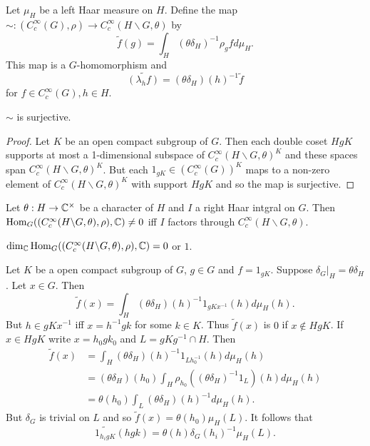 \documentclass{memoir}
\begin{document}
\begin{definition}
    Let $\mu_H$ be a left Haar measure on $H$.
    Define the map $\sim:(C_c^\infty(G),\rho)\to C_c^\infty(H\backslash G,\theta)$ by
    \begin{equation}
        \tilde f(g) = \int_H (\theta\delta_H)^{-1}\rho_gfd\mu_H.
    \end{equation}
    This map is a $G$-homomorphism and 
    \begin{equation}
        \widetilde{(\lambda_hf)} = (\theta\delta_H)(h)^{-1}\tilde f
    \end{equation}
    for $f\in C_c^\infty(G),h\in H$.
\end{definition}
\begin{lemma}
    $\sim$ is surjective.
\end{lemma}
\begin{proof}
    Let $K$ be an open compact subgroup of $G$.
    Then each double coset $HgK$ supports at most a 1-dimensional subspace of $C_c^\infty(H\backslash G,\theta)^K$ and these spaces span $C_c^\infty(H\backslash G,\theta)^K$.
    But each $1_{gK}\in (C_c^\infty(G))^K$ maps to a non-zero element of $C_c^\infty(H\backslash G,\theta)^K$ with support $HgK$ and so the map is surjective.
\end{proof}
\begin{corollary}
    Let $\theta:H\to \mathbb{C}^\times$ be a character of $H$ and $I$ a right Haar intgral on $G$.
    Then $\operatorname{Hom}_G((C_c^\infty(H\backslash G,\theta),\rho),\mathbb{C}) \ne 0$ iff $I$ factors through $C_c^\infty(H\backslash G,\theta)$.
\end{corollary}
\begin{corollary}
    $\dim_{\mathbb{C}}\operatorname{Hom}_G((C_c^\infty(H\backslash G,\theta),\rho),\mathbb{C}) = 0$ or $1$.
\end{corollary}
\begin{remark}
    Let $K$ be a open compact subgroup of $G$, $g\in G$ and $f = 1_{gK}$.
    Suppose $\delta_G|_H = \theta \delta_H$.
    Let $x\in G$. 
    Then 
    \begin{equation}
        \tilde f(x) = \int_H (\theta\delta_H)(h)^{-1}1_{gKx^{-1}}(h) d\mu_H(h).
    \end{equation}
    But $h\in gKx^{-1}$ iff $x = h^{-1}gk$ for some $k\in K$.
    Thus $\tilde f(x)$ is $0$ if $x\not\in HgK$.
    If $x\in HgK$ write $x = h_0gk_0$ and $L = gKg^{-1}\cap H$.
    Then 
    \begin{align}
        \tilde f(x) &= \int_H (\theta\delta_H)(h)^{-1}1_{Lh_0^{-1}}(h) d\mu_H(h) \nonumber \\
                    &= (\theta\delta_H)(h_0) \int_H \rho_{h_0}((\theta\delta_H)^{-1}1_{L})(h) d\mu_H(h) \nonumber \\
                    &= \theta(h_0)\int_L (\theta\delta_H)(h)^{-1}d\mu_H(h).
    \end{align}
    But $\delta_G$ is trivial on $L$ and so $\tilde f(x) = \theta(h_0)\mu_H(L)$.
    It follows that 
    \begin{equation}
        \widetilde{1_{h_igK}}(hgk) = \theta(h)\delta_G(h_i)^{-1}\mu_H(L).
    \end{equation}
\end{remark}
\end{document}
